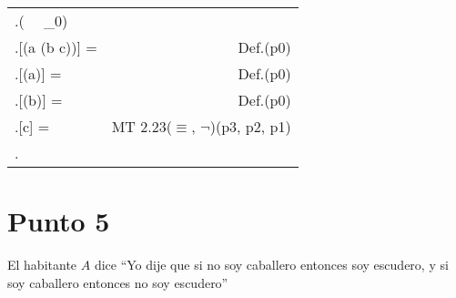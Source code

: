 \documentclass{article}
\newcommand{\q}[1]{``#1''}
\newcommand{\val}[2]{\mathbf{#1}[#2]}
\newlength{\logicv}
\newenvironment{subproofill}[1][0]{
  \begin{tcolorbox}[demo, title = ]
    \vspace*{-#1\logicv}
}{
  \end{tcolorbox}
  \vspace*{-.5cm}
}
\newenvironment{subproof}[2][0]{
  \begin{tcolorbox}[demo, title = #2, colframe = black]
  \vspace*{#1\logicv}
  \begin{logic}
}{
  \end{logic}
  \end{tcolorbox}
}
\newenvironment{logic}{
    \setlength{\extrarowheight}{3pt}
    \setcounter{row}{-1}
    \begin{center}
    \begin{NiceTabular}{>{\stepcounter{row}\therow.\hspace*{5pt}} L r }
}{
    \end{NiceTabular}
    \end{center}
}
\begin{document}
\begin{subproofill}
  \begin{subproof}{Con $\Gamma_3$}
    (\exists {} \, \vert\,   \Gamma_0)\\
    \val{v}{(a \equiv (b \equiv c))} =  & Def.(p0)\\
    \val{v}{(\neg a)} =  & Def.(p0)\\
    \val{v}{(\neg b)} =  & Def.(p0)\\
    \val{v}{c} =  & MT 2.23($\equiv$, $\neg$)(p3, p2, p1)\\
  \end{subproof}
\end{subproofill}

\section{Punto 5}

El habitante $A$ dice \q{Yo dije que si no soy caballero entonces soy escudero, y si soy caballero entonces no soy escudero} 
\end{document}
